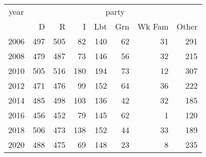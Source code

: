 \footnotesize\begin{tabular}[t]{lrrrrrrr}
\toprule
\multicolumn{1}{c}{year} & \multicolumn{7}{c}{party} \\
\cmidrule(l{3pt}r{3pt}){1-1} \cmidrule(l{3pt}r{3pt}){2-8}
  & D & R & I & Lbt & Grn & Wk Fam & Other\\
\midrule
2006 & 497 & 505 & 82 & 140 & 62 & 31 & 291\\
2008 & 479 & 487 & 73 & 146 & 56 & 32 & 215\\
2010 & 505 & 516 & 180 & 194 & 73 & 12 & 307\\
2012 & 471 & 476 & 99 & 152 & 64 & 36 & 222\\
2014 & 485 & 498 & 103 & 136 & 42 & 32 & 185\\
2016 & 456 & 452 & 79 & 145 & 62 & 1 & 120\\
2018 & 506 & 473 & 138 & 152 & 44 & 33 & 189\\
2020 & 488 & 475 & 69 & 148 & 23 & 8 & 235\\
\bottomrule
\end{tabular}
